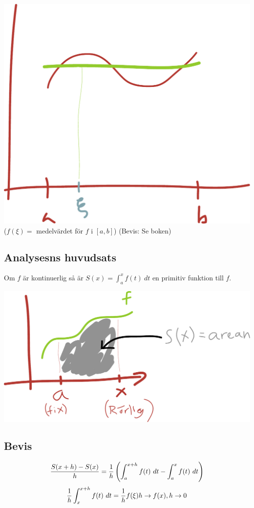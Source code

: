 \documentclass{article}
\newcommand{\intx}[1]{\int^x_a{#1\ dt}}
\begin{document}
\includegraphics[scale=0.25]{img/img4.pdf}\\

($f(\xi)=$ medelvärdet för $f$ i $[a,b]$)
(Bevis: Se boken)

\subsection{Analysesns huvudsats}
Om $f$ är kontinuerlig så är $S(x) = \intx{f(t)}$ en primitiv funktion till $f$.

\includegraphics[scale=0.25]{img/img5.pdf}

\subsection{Bevis}
$$ \f{S(x+h) - S(x)}h = \f 1h \pa{\int_a^{x+h}{f(t)\ dt} - \intx{f(t)}} $$
$$ \frac{1}{h}\int^{x+h}_x{f(t)\ dt} = \frac{1}{h} f(\xi) h \to f(x), h \to 0$$
\end{document}
